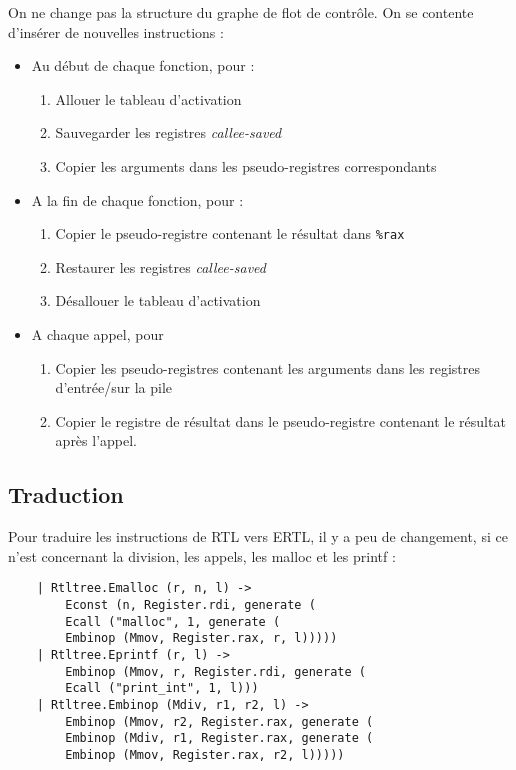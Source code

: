 \documentclass{cours}
\begin{document}
On ne change pas la structure du graphe de flot de contrôle. On se contente d'insérer de nouvelles instructions :
\begin{itemize}
    \item Au début de chaque fonction, pour :
    \begin{enumerate}
        \item Allouer le tableau d'activation
        \item Sauvegarder les registres \textit{callee-saved}
        \item Copier les arguments dans les pseudo-registres correspondants
    \end{enumerate}
    \item A la fin de chaque fonction, pour : 
    \begin{enumerate}
        \item Copier le pseudo-registre contenant le résultat dans \texttt{\%rax}
        \item Restaurer les registres \textit{callee-saved}
        \item Désallouer le tableau d'activation
    \end{enumerate}
    \item A chaque appel, pour 
    \begin{enumerate}
        \item Copier les pseudo-registres contenant les arguments dans les registres d'entrée/sur la pile
        \item Copier le registre de résultat dans le pseudo-registre contenant le résultat après l'appel. 
    \end{enumerate}
\end{itemize}

\subsection{Traduction}
Pour traduire les instructions de RTL vers ERTL, il y a peu de changement, si ce n'est concernant la division, les appels, les malloc et les printf : 
\begin{verbatim}
    | Rtltree.Emalloc (r, n, l) ->
        Econst (n, Register.rdi, generate (
        Ecall ("malloc", 1, generate (
        Embinop (Mmov, Register.rax, r, l)))))
    | Rtltree.Eprintf (r, l) ->
        Embinop (Mmov, r, Register.rdi, generate (
        Ecall ("print_int", 1, l)))
    | Rtltree.Embinop (Mdiv, r1, r2, l) ->
        Embinop (Mmov, r2, Register.rax, generate (
        Embinop (Mdiv, r1, Register.rax, generate (
        Embinop (Mmov, Register.rax, r2, l)))))
\end{verbatim}
\end{document}
